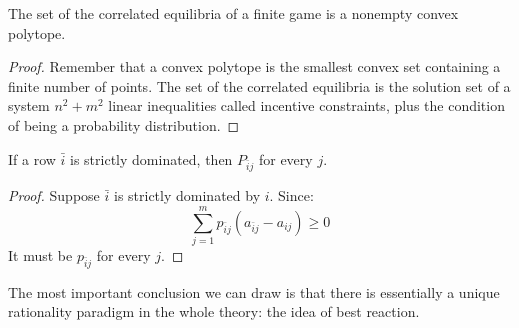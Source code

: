 \begin{theorem}
    The set of the correlated equilibria of a finite game is a nonempty convex polytope.
\end{theorem}
\begin{proof}
    Remember that a convex polytope is the smallest convex set containing a finite number of points. 
    The set of the correlated equilibria is the solution set of a system $n^2+m^2$ linear inequalities called incentive constraints, plus the condition of being a probability distribution.
\end{proof}
\begin{proposition}
    If a row $\bar{i}$ is strictly dominated, then $P_{\bar{i}j}$ for every $j$. 
\end{proposition}
\begin{proof}
    Suppose $\bar{i}$ is strictly dominated by $i$. 
    Since: 
    \[\sum_{j=1}^{m}p_{\bar{i}j}(a_{\bar{i}j}-a_{ij})\geq 0\]
    It must be $p_{\bar{i}j}$ for every $j$. 
\end{proof}
\noindent The most important conclusion we can draw is that there is essentially a unique rationality paradigm in the whole theory: the idea of best reaction. 